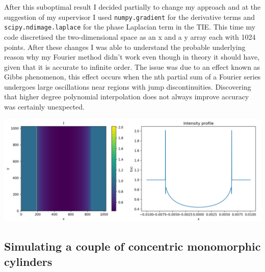 \documentclass[9pt, a4paper]{article}
\newenvironment{Figure}
    {\par\medskip\noindent\minipage{\linewidth}}
    {\endminipage\par\medskip}
\begin{document}
After this suboptimal result I decided partially to change my approach and at the suggestion of my supervisor I used \texttt{numpy.gradient} for the derivative terms and \texttt{scipy.ndimage.laplace} for the phase Laplacian term in the TIE. This time my code discretised the two-dimensional space as an x and a y array each with 1024 points. 
After these changes I was able to understand the probable underlying reason why my Fourier method didn't work even though in theory it should have, given that it is accurate to infinite order\cite{Chris}\cite{Fornberg}. The issue was due to an effect known as Gibbs phenomenon, this effect occurs when the nth partial sum of a Fourier series undergoes large oscillations near regions with jump discontinuities\cite{Gibbs}. Discovering that higher degree polynomial interpolation does not always improve accuracy was certainly unexpected.
\begin{Figure}
\centering
\includegraphics[width=\linewidth]{FD_intensity_profile.pdf}
\end{Figure}


\subsection{Simulating a couple of concentric monomorphic cylinders}
\end{document}
